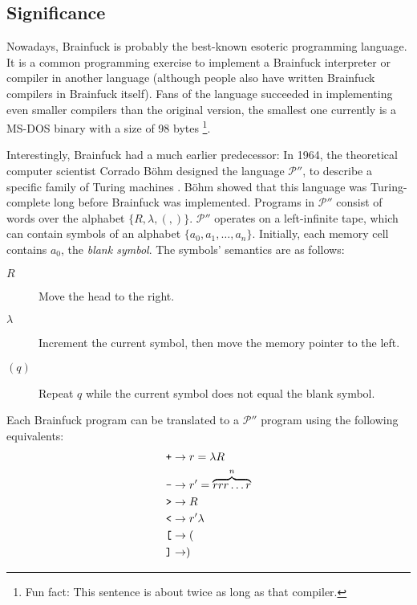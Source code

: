 \subsection{Significance}

Nowadays, Brainfuck is probably the best-known esoteric programming language. It is a common programming exercise to implement a Brainfuck interpreter or compiler in another language (although people also have written Brainfuck compilers in Brainfuck itself). Fans of the language succeeded in implementing even smaller compilers than the original version, the smallest one currently is a MS-DOS binary with a size of 98 bytes \cite{inte1999entry}\footnote{Fun fact: This sentence is about twice as long as that compiler.}.

\label{pprimeprime}

Interestingly, Brainfuck had a much earlier predecessor: In 1964, the theoretical computer scientist Corrado Böhm designed the language $\mathcal{P}''$, to describe a specific family of Turing machines \cite{bohm1964family}. Böhm showed that this language was Turing-complete long before Brainfuck was implemented. Programs in $\mathcal{P}''$ consist of words over the alphabet $\{R, \lambda, (, )\}$. $\mathcal{P}''$ operates on a left-infinite tape, which can contain symbols of an alphabet $\{a_0, a_1, \dots, a_n\}$. Initially, each memory cell contains $a_0$, the \emph{blank symbol}. The symbols' semantics are as follows:

\begin{description}
    \item[\boldmath$R$] Move the head to the right.
    \item[\boldmath$\lambda$] Increment the current symbol, then move the memory pointer to the left.
    \item[\boldmath$(q)$] Repeat $q$ while the current symbol does not equal the blank symbol.
\end{description}

Each Brainfuck program can be translated  to a $\mathcal{P}''$ program using the following equivalents:
\begin{align*}
    \text{\texttt{+}} &\rightarrow r = \lambda R\\
    \text{\texttt{-}} &\rightarrow r' = \overbrace{rrr\dots r}^n\\
    \text{\texttt{>}} &\rightarrow R\\
    \text{\texttt{<}} &\rightarrow r'\lambda\\
    \text{\texttt{[}} &\rightarrow (\\
    \text{\texttt{]}} &\rightarrow )
\end{align*}

